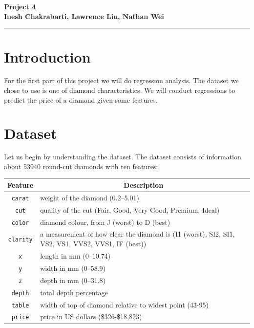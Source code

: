 \documentclass[11pt,letterpaper]{article}
\begin{document}

\begin{center}
    \begin{minipage}{10cm}
    	\begin{center}
    	\textbf{\large Project 4}\\[0.1cm]
        \textbf{Inesh Chakrabarti, Lawrence Liu, Nathan Wei}\\[0.1cm]
    	\end{center}
    \end{minipage}\hfill
\end{center}

\rule{17cm}{0.1mm}


\section*{Introduction}
For the first part of this project we will do regression analysis. The dataset 
we chose to use is one of diamond characteristics. We will conduct regressions
to predict the price of a diamond given some features. 


\section*{Dataset}
Let us begin by understanding the dataset. The dataset consists of information
about 53940 round-cut diamonds with ten features: 
\begin{table}[ht]

\label{table1} 
\begin{tabular}{cl} 
\hline
\multicolumn{1}{c}{Feature} & \multicolumn{1}{c}{Description}\\
\hline 
    \texttt{carat} & weight of the diamond (0.2–5.01) \\
    \texttt{cut} & quality of the cut (Fair, Good, Very Good, Premium, Ideal) \\
    \texttt{color} & diamond colour, from J (worst) to D (best) \\
    \texttt{clarity} & a measurement of how clear the diamond is (I1 (worst),  
    SI2, SI1, VS2, VS1, VVS2, VVS1, IF (best)) \\
    \texttt{x} & length in mm (0–10.74) \\
    \texttt{y} & width in mm (0–58.9) \\
    \texttt{z} & depth in mm (0–31.8) \\
    \texttt{depth} & total depth percentage \\
    \texttt{table} & width of top of diamond relative to widest point (43-95) \\
    \texttt{price} & price in US dollars (\$326-\$18,823)
\end{tabular}
\end{table}
\end{document}
